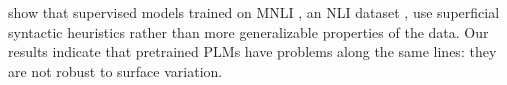 
\citet{mccoy2019right}  show that supervised models trained on MNLI \cite{mnli}, an NLI
dataset \cite{snli}, use
superficial syntactic heuristics rather than more
generalizable properties of the data.
Our results indicate that pretrained PLMs have  problems along
the same lines:
they are not robust to surface variation.


